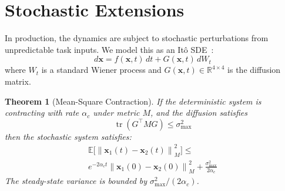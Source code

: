 \documentclass[11pt,twocolumn]{article}
\newtheorem{theorem}{Theorem}[section]
\newcommand{\R}{\mathbb{R}}
\newcommand{\norm}[1]{\left\lVert #1 \right\rVert}
\newcommand{\eisv}{\ensuremath{\mathbf{x}}}
\begin{document}
\section{Stochastic Extensions}
\label{sec:stochastic}

In production, the dynamics are subject to stochastic perturbations
from unpredictable task inputs. We model this as an It\^{o} SDE~\cite{ito1944}:
\begin{equation}
  d\eisv = f(\eisv, t)\,dt + G(\eisv, t)\,dW_t
  \label{eq:sde}
\end{equation}
where $W_t$ is a standard Wiener process and
$G(\eisv, t) \in \R^{4 \times 4}$ is the diffusion matrix.

\begin{theorem}[Mean-Square Contraction]
\label{thm:stochastic}
If the deterministic system is contracting with rate $\alpha_c$ under
metric $M$, and the diffusion satisfies
\begin{equation}
  \operatorname{tr}(G^\top M G) \leq \sigma_{\max}^2
  \label{eq:diffusion-bound}
\end{equation}
then the stochastic system satisfies:
\begin{multline}
  \mathbb{E}\bigl[\norm{\eisv_1(t) - \eisv_2(t)}_M^2\bigr] \leq \\
  e^{-2\alpha_c t}\norm{\eisv_1(0) - \eisv_2(0)}_M^2
  + \frac{\sigma_{\max}^2}{2\alpha_c}
  \label{eq:mean-square}
\end{multline}
The steady-state variance is bounded by
$\sigma_{\max}^2 / (2\alpha_c)$.
\end{theorem}
\end{document}
